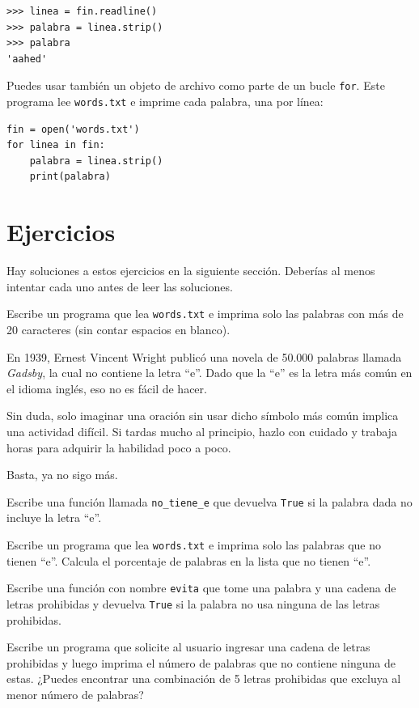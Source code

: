 \documentclass[10pt]{book}
\begin{document}
\begin{verbatim}
>>> linea = fin.readline()
>>> palabra = linea.strip()
>>> palabra
'aahed'
\end{verbatim}
%
Puedes usar también un objeto de archivo como parte de un bucle {\tt for}.
Este programa lee {\tt words.txt} e imprime cada palabra, una
por línea:

\begin{verbatim}
fin = open('words.txt')
for linea in fin:
    palabra = linea.strip()
    print(palabra)
\end{verbatim}
%

\section{Ejercicios}

Hay soluciones a estos ejercicios en la siguiente sección.
Deberías al menos intentar cada uno antes de leer las soluciones.

\begin{exercise}
Escribe un programa que lea {\tt words.txt} e imprima solo las
palabras con más de 20 caracteres (sin contar espacios en blanco).

\end{exercise}

\begin{exercise}

En 1939, Ernest Vincent Wright publicó una novela de 50.000 palabras llamada
{\em Gadsby}, la cual no contiene la letra ``e''.  Dado que la ``e'' es
la letra más común en el idioma inglés, eso no es fácil de hacer.

Sin duda, solo imaginar una oración sin usar dicho símbolo más común
implica una actividad difícil.  Si tardas mucho al principio, hazlo con cuidado
y trabaja horas para adquirir la habilidad poco a poco.

Basta, ya no sigo más.

Escribe una función llamada \verb"no_tiene_e" que devuelva {\tt True} si
la palabra dada no incluye la letra ``e''.

Escribe un programa que lea {\tt words.txt} e imprima solo las palabras
que no tienen ``e''.  Calcula el porcentaje de palabras en la lista
que no tienen ``e''.

\end{exercise}


\begin{exercise}

Escribe una función con nombre {\tt evita}
que tome una palabra y una cadena de letras prohibidas y
devuelva {\tt True} si la palabra no usa ninguna de las letras
prohibidas.

Escribe un programa que solicite al usuario ingresar una cadena
de letras prohibidas y luego imprima el número de palabras que
no contiene ninguna de estas.
¿Puedes encontrar una combinación de 5 letras prohibidas que
excluya al menor número de palabras?

\end{exercise}
\end{document}
